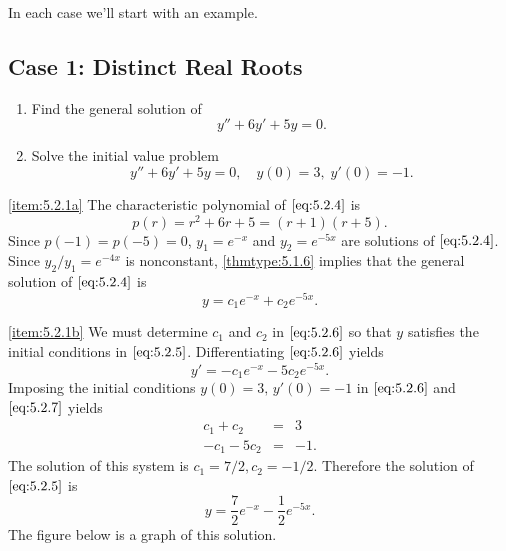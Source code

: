 \documentclass{ximera}
\begin{document}
In each case we'll start with an example.
 
\subsection*{Case 1: Distinct Real Roots}
 
\begin{example}\label{example:5.2.1}
\begin{enumerate}
    \item \label{item:5.2.1a}%
Find the general solution of
\begin{equation} \label{eq:5.2.4}
y''+6y'+5y=0.
\end{equation}
 
\item \label{item:5.2.1b}%
Solve the initial value problem
\begin{equation} \label{eq:5.2.5}
y''+6y'+5y=0, \quad   y(0)=3,\;  y'(0)=-1.
\end{equation}
\end{enumerate}
 
\begin{explanation}
\ref{item:5.2.1a}   The characteristic
polynomial of
$\eqref{eq:5.2.4}$ is
$$
p(r)=r^2+6r+5=(r+1)(r+5).
$$
Since $p(-1)=p(-5)=0$,  $y_1=e^{-x}$ and $y_2=e^{-5x}$
are solutions of $\eqref{eq:5.2.4}$. Since $y_2/y_1=e^{-4x}$  is
nonconstant, \ref{thmtype:5.1.6} implies that the general solution
of $\eqref{eq:5.2.4}$ is
\begin{equation} \label{eq:5.2.6}
y=c_1e^{-x}+c_2e^{-5x}.
\end{equation}
 
\ref{item:5.2.1b} We  must determine $c_1$ and $c_2$
in  $\eqref{eq:5.2.6}$ so that $y$ satisfies the initial conditions in
$\eqref{eq:5.2.5}$. Differentiating  $\eqref{eq:5.2.6}$ yields
\begin{equation} \label{eq:5.2.7}
y'=-c_1e^{-x}-5c_2e^{-5x}.
\end{equation}
Imposing the initial conditions $y(0)=3,\, y'(0)=-1$ in $\eqref{eq:5.2.6}$
and $\eqref{eq:5.2.7}$ yields
$$\begin{array}{rcr}
c_1+c_2 & = & 3\\
-c_1-5c_2 & = & -1.
\end{array}$$
 The solution of this system is $c_1=7/2,c_2=-1/2$.  Therefore
the solution of  $\eqref{eq:5.2.5}$ is
$$
y=\frac{7}{2}e^{-x}-\frac{1}{2}e^{-5x}.
$$
The figure below is a graph
of this solution.


\end{explanation}
\end{example}
\end{document}
